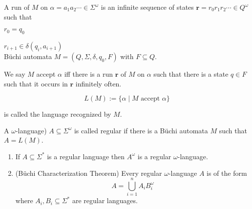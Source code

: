 \documentclass[12pt]{article}
\begin{document}
A run of $M$ on $\alpha=a_1a_2\cdots\in\Sigma^{\omega}$ is an infinite sequence of states $\mathbf{r}=r_0r_1r_2\cdots\in Q^{\omega}$ such that

$r_0=q_0$

$r_{i+1}\in \delta(q_i,a_{i+1})$
\ \\


B\"{u}chi automata $M=(Q,\Sigma,\delta, q_0, F)$ with $F\subseteq Q$.

We say $M$ accept $\alpha$  iff there is a run $\mathbf{r}$ of $M$ on $\alpha$ such that there is a state $q\in F$ such that it occurs in $\mathbf{r}$ infinitely often. 

$$L(M):=\{\alpha\mid M \mbox{ accept } \alpha\}$$ 

is called the language recognized by $M$. 

A $\omega$-language) $A\subseteq \Sigma^{\omega}$ is called regular if there is a B\"{u}chi automata $M$ such that $A=L(M)$.  



\begin{enumerate}
\item If $A\subseteq\Sigma^*$ is a regular language then $A^{\omega}$ is a regular $\omega$-language.

\item (B\"{u}chi Characterization Theorem) Every regular $\omega$-language $A$ is of the form $$A=\bigcup_{i=1}^nA_iB_i^{\omega}$$
where $A_i, B_i\subseteq \Sigma^*$ are regular languages. 
\end{enumerate}
\end{document}
